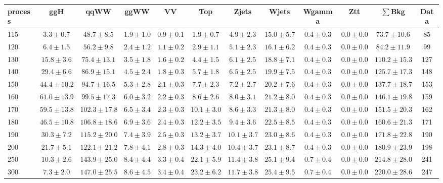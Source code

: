 \begin{table}
{\tiny
 \begin{center}
 \begin{tabular}{l c c c c c c c c c c c }
 \hline
 process & ggH & qqWW & ggWW & VV & Top & Zjets & Wjets & Wgamma & Ztt & $\sum$Bkg & Data \\
 \hline
115 & $3.3\pm0.7$ & $48.7\pm8.5$ & $1.9\pm1.0$ & $0.9\pm0.1$ & $1.9\pm0.7$ & $4.9\pm2.3$ & $15.0\pm5.7$ & $0.4\pm0.3$ & $0.0\pm0.0$ & $73.7\pm10.6$ & 85 \\
120 & $6.4\pm1.5$ & $56.2\pm9.8$ & $2.4\pm1.2$ & $1.1\pm0.2$ & $2.9\pm1.1$ & $5.1\pm2.3$ & $16.1\pm6.2$ & $0.4\pm0.3$ & $0.0\pm0.0$ & $84.2\pm11.9$ & 99 \\
130 & $15.8\pm3.6$ & $75.4\pm13.1$ & $3.5\pm1.8$ & $1.6\pm0.2$ & $4.4\pm1.5$ & $6.1\pm2.5$ & $18.8\pm7.1$ & $0.4\pm0.3$ & $0.0\pm0.0$ & $110.2\pm15.3$ & 127 \\
140 & $29.4\pm6.6$ & $86.9\pm15.1$ & $4.5\pm2.4$ & $1.8\pm0.3$ & $5.7\pm1.8$ & $6.5\pm2.5$ & $19.9\pm7.5$ & $0.4\pm0.3$ & $0.0\pm0.0$ & $125.7\pm17.3$ & 148 \\
150 & $44.4\pm10.2$ & $94.7\pm16.5$ & $5.3\pm2.8$ & $2.1\pm0.3$ & $7.7\pm2.3$ & $7.2\pm2.7$ & $20.2\pm7.6$ & $0.4\pm0.3$ & $0.0\pm0.0$ & $137.7\pm18.7$ & 153 \\
160 & $61.0\pm13.9$ & $99.5\pm17.3$ & $6.0\pm3.2$ & $2.2\pm0.3$ & $8.6\pm2.6$ & $8.0\pm3.1$ & $21.2\pm8.0$ & $0.4\pm0.3$ & $0.0\pm0.0$ & $146.1\pm19.8$ & 159 \\
170 & $59.5\pm13.8$ & $102.3\pm17.8$ & $6.5\pm3.4$ & $2.3\pm0.3$ & $10.1\pm3.0$ & $8.6\pm3.3$ & $21.3\pm8.0$ & $0.4\pm0.3$ & $0.0\pm0.0$ & $151.5\pm20.3$ & 162 \\
180 & $46.5\pm10.8$ & $106.8\pm18.6$ & $6.9\pm3.6$ & $2.4\pm0.3$ & $12.2\pm3.5$ & $9.4\pm3.6$ & $22.5\pm8.5$ & $0.4\pm0.3$ & $0.0\pm0.0$ & $160.6\pm21.3$ & 171 \\
190 & $30.3\pm7.2$ & $115.2\pm20.0$ & $7.4\pm3.9$ & $2.5\pm0.3$ & $13.2\pm3.7$ & $10.1\pm3.7$ & $23.0\pm8.6$ & $0.4\pm0.3$ & $0.0\pm0.0$ & $171.8\pm22.8$ & 190 \\
200 & $21.7\pm5.1$ & $122.1\pm21.2$ & $7.8\pm4.1$ & $2.8\pm0.3$ & $14.3\pm4.0$ & $10.4\pm3.7$ & $23.1\pm8.7$ & $0.4\pm0.3$ & $0.0\pm0.0$ & $180.9\pm23.9$ & 198 \\
250 & $10.3\pm2.6$ & $143.9\pm25.0$ & $8.4\pm4.4$ & $3.3\pm0.4$ & $22.1\pm5.9$ & $11.4\pm3.8$ & $25.1\pm9.4$ & $0.7\pm0.4$ & $0.0\pm0.0$ & $214.8\pm28.0$ & 241 \\
300 & $7.3\pm2.0$ & $147.0\pm25.5$ & $8.6\pm4.5$ & $3.4\pm0.4$ & $23.2\pm6.2$ & $11.7\pm3.8$ & $25.4\pm9.5$ & $0.7\pm0.4$ & $0.0\pm0.0$ & $220.0\pm28.6$ & 247 \\

\end{tabular}
\end{center}}
\end{table}
